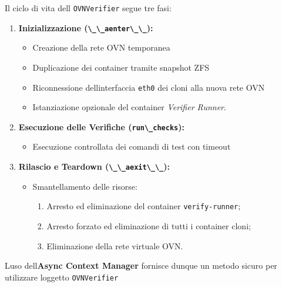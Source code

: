 Il ciclo di vita dell\textquotesingle{}
\passthrough{\lstinline!OVNVerifier!} segue tre fasi:

\begin{enumerate}
\def\labelenumi{\arabic{enumi}.}
\tightlist
\item
  \textbf{Inizializzazione (\passthrough{\lstinline!\_\_aenter\_\_!}):}

  \begin{itemize}
  \tightlist
  \item
    Creazione della rete OVN temporanea
  \item
    Duplicazione dei container tramite snapshot ZFS
  \item
    Riconnessione dell\textquotesingle interfaccia
    \passthrough{\lstinline!eth0!} dei cloni alla nuova rete OVN
  \item
    Istanziazione opzionale del container \emph{Verifier Runner}.
  \end{itemize}
\item
  \textbf{Esecuzione delle Verifiche
  (\passthrough{\lstinline!run\_checks!}):}

  \begin{itemize}
  \tightlist
  \item
    Esecuzione controllata dei comandi di test con timeout
  \end{itemize}
\item
  \textbf{Rilascio e Teardown
  (\passthrough{\lstinline!\_\_aexit\_\_!}):}

  \begin{itemize}
  \tightlist
  \item
    Smantellamento delle risorse:

    \begin{enumerate}
    \def\labelenumii{\arabic{enumii}.}
    \tightlist
    \item
      Arresto ed eliminazione del container
      \passthrough{\lstinline!verify-runner!};
    \item
      Arresto forzato ed eliminazione di tutti i container cloni;
    \item
      Eliminazione della rete virtuale OVN.
    \end{enumerate}
  \end{itemize}
\end{enumerate}

L\textquotesingle uso dell\textquotesingle{}\textbf{Async Context
Manager} fornisce dunque un metodo sicuro per utilizzare
l\textquotesingle oggetto \passthrough{\lstinline!OVNVerifier!}

